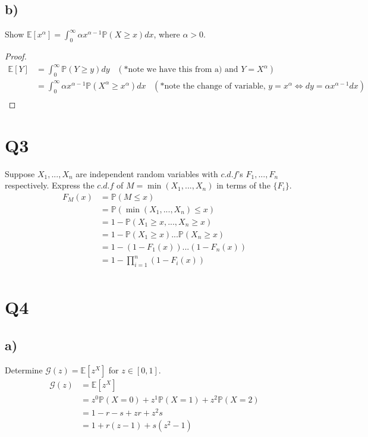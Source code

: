 \documentclass{article}
\begin{document}
\subsection*{b)}
Show $\mathbb{E}[x^\alpha]=\int_0^\infty\alpha x^{\alpha-1}\mathbb{P}(X\geq x)dx$, where $\alpha>0$.
\begin{proof}
\begin{align*}
\mathbb{E}[Y]&=\int_0^\infty\mathbb{P}(Y\geq y)dy\;\;\; (*\text{note we have this from a) and }Y=X^\alpha)\\
&=\int_0^\infty \alpha x^{\alpha-1}\mathbb{P}(X^\alpha\geq x^\alpha)dx\;\;\;(*\text{note the change of variable, }y=x^\alpha\iff dy=\alpha x^{\alpha-1}dx)\\
\end{align*}
\end{proof}
\section*{Q3}
Suppose $X_1,...,X_n$ are independent random variables with $c.d.f$'s $F_1,...,F_n$ respectively. Express the $c.d.f$ of $M=\min(X_1,...,X_n)$ in terms of the $\{F_i\}$.
\newline\newline
\begin{align*}
F_M(x)&=\mathbb{P}(M\leq x)\\
&=\mathbb{P}(\min(X_1,...,X_n)\leq x)\\
&=1-\mathbb{P}(X_1\geq x,...,X_n\geq x)\\
&=1-\mathbb{P}(X_1\geq x)...\mathbb{P}(X_n\geq x)\\
&=1-(1-F_1(x))...(1-F_n(x))\\
&=1-\prod_{i=1}^n(1-F_{i}(x))\\
\end{align*}
\section*{Q4}
\subsection*{a)}
Determine $\mathcal{G}(z)=\mathbb{E}\left[z^X\right]$ for $z\in[0,1]$.
\newline\newline
\begin{align*}
\mathcal{G}(z)&=\mathbb{E}\left[z^X\right]\\
&=z^0\mathbb{P}(X=0)+z^1\mathbb{P}(X=1)+z^2\mathbb{P}(X=2)\\
&=1-r-s+zr+z^2s\\
&=1+r(z-1)+s(z^2-1)\\
\end{align*}
\end{document}

